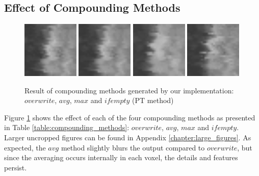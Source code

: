 \subsection{Effect of Compounding Methods}

	\begin{figure}[h]
	\centering
	\includegraphics[width=0.24\textwidth]{graphics/overwrite.png}
	\includegraphics[width=0.24\textwidth]{graphics/avg.png}
	\includegraphics[width=0.24\textwidth]{graphics/max.png}
	\includegraphics[width=0.24\textwidth]{graphics/ifempty.png}
	\caption[Result of compounding methods]{Result of compounding methods generated by our implementation: $overwrite$, $avg$, $max$ and $ifempty$ (PT method)}
	\label{fig:compounding methods}
	\end{figure}
	
	Figure \ref{fig:compounding methods} shows the effect of each of the four compounding methods as presented in Table \ref{table:compounding_methods}: $overwrite$, $avg$, $max$ and $ifempty$. Larger uncropped figures can be found in Appendix \ref{chapter:large_figures}. As expected, the $avg$ method slightly blurs the output compared to $overwrite$, but since the averaging occurs internally in each voxel, the details and features persist.
	
